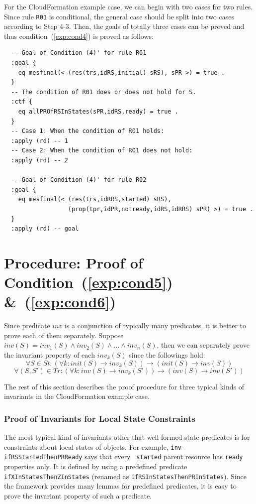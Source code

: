 \documentclass[12pt]{report}
\newcommand{\ra}{\rightarrow}
\begin{document}
For the CloudFormation example case, we can begin with two cases for
two rules. Since rule {\tt R01} is conditional, the general case
should be split into two cases according to Step 4-3. Then, the goals
of totally three cases can be proved and thus condition~(\ref{exp:cond4}) is proved
as follows:
\small
\begin{verbatim}
  -- Goal of Condition (4)' for rule R01
  :goal {
    eq mesfinal(< (res(trs,idRS,initial) sRS), sPR >) = true .
  }
  -- The condition of R01 does or does not hold for S.
  :ctf {
    eq allPROfRSInStates(sPR,idRS,ready) = true .
  }
  -- Case 1: When the condition of R01 holds:
  :apply (rd) -- 1
  -- Case 2: When the condition of R01 does not hold:
  :apply (rd) -- 2

  -- Goal of Condition (4)' for rule R02
  :goal {
    eq mesfinal(< (res(trs,idRRS,started) sRS),
                  (prop(tpr,idPR,notready,idRS,idRRS) sPR) >) = true .
  }
  :apply (rd) -- goal
\end{verbatim}
\normalsize

\section{Procedure: Proof of Condition~(\ref{exp:cond5}) \&~(\ref{exp:cond6})}
\label{sec:invariant}
Since predicate $inv$ is a conjunction of typically many predicates, it is
better to prove each of them separately. Suppose $inv(S) =
inv_1(S)\land inv_2(S)\land\dots\land inv_n(S)$, then we can
separately prove the invariant property of each $inv_k(S)$ since the
followings hold:
\[\forall S\in St: (\forall k:init(S)\ra inv_k(S))\ra(init(S)\ra inv(S))\]
\[\forall (S,S')\in T\!r: (\forall k:inv(S)\ra inv_k(S'))\ra(inv(S)\ra inv(S'))\]

\vspace{0.3cm}
The rest of this section describes the proof procedure for three
typical kinds of invariants in the CloudFormation example case.

\subsubsection*{Proof of Invariants for Local State Constraints}
The most typical kind of invariants other that well-formed state
predicates is for constraints about local states of objects.  For
example, {\tt inv-ifRSStartedThenPRReady} says that every {\tt
  started} parent resource has {\tt ready} properties only.  It is
defined by using a predefined predicate {\tt ifXInStatesThenZInStates}
(renamed as {\tt ifRSInStatesThenPRInStates}). Since the framework
provides many lemmas for predefined predicates, it is easy to
prove the invariant property of such a predicate. \\
\end{document}
